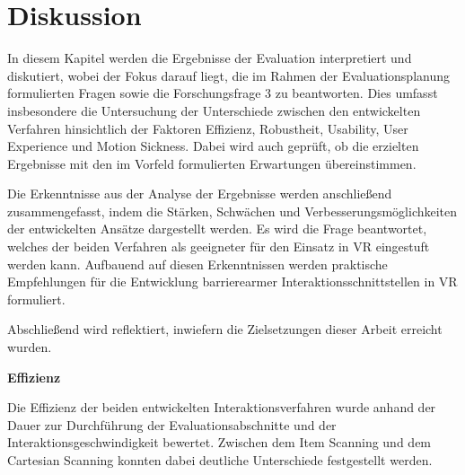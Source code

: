 \chapter{Diskussion}
\label{chap:Diskussion}

In diesem Kapitel werden die Ergebnisse der Evaluation interpretiert und diskutiert, wobei der Fokus darauf liegt, die im Rahmen der Evaluationsplanung formulierten Fragen sowie die Forschungsfrage 3 zu beantworten. Dies umfasst insbesondere die Untersuchung der Unterschiede zwischen den entwickelten Verfahren hinsichtlich der Faktoren Effizienz, Robustheit, Usability, User Experience und Motion Sickness. Dabei wird auch geprüft, ob die erzielten Ergebnisse mit den im Vorfeld formulierten Erwartungen übereinstimmen.

Die Erkenntnisse aus der Analyse der Ergebnisse werden anschließend zusammengefasst, indem die Stärken, Schwächen und Verbesserungsmöglichkeiten der entwickelten Ansätze dargestellt werden. Es wird die Frage beantwortet, welches der beiden Verfahren als geeigneter für den Einsatz in VR eingestuft werden kann. Aufbauend auf diesen Erkenntnissen werden praktische Empfehlungen für die Entwicklung barrierearmer Interaktionsschnittstellen in VR formuliert.

Abschließend wird reflektiert, inwiefern die Zielsetzungen dieser Arbeit erreicht wurden.

\textbf{Effizienz}

Die Effizienz der beiden entwickelten Interaktionsverfahren wurde anhand der Dauer zur Durchführung der Evaluationsabschnitte und der Interaktionsgeschwindigkeit bewertet. Zwischen dem Item Scanning und dem Cartesian Scanning konnten dabei deutliche Unterschiede festgestellt werden.

